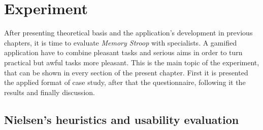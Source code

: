 \chapter{Experiment}
\label{ch:Experiment}

After presenting theoretical basis and the application's development in previous chapters, it is time to evaluate \textit{Memory Stroop} with specialists. A gamified application have to combine pleasant tasks and serious aims in order to turn practical but awful tasks more pleasant. This is the main topic of the experiment, that can be shown in every section of the present chapter. First it is presented the applied format of case study, after that the questionnaire, following it the results and finally discussion.

\section{Nielsen's heuristics and usability evaluation}

